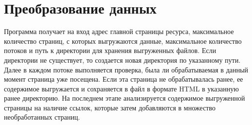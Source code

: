\chapter{Преобразование данных}

Программа получает на вход адрес главной страницы ресурса, максимальное количество страниц, с которых выгружаются данные, максимальное количество потоков и путь к директории для хранения выгруженных файлов. Если директории не существует, то создается новая директория по указанному пути. Далее в каждом потоке выполняется проверка, была ли обрабатываемая в данный момент страница уже посещена. Если эта страница не обрабатывалась ранее, ее содержимое выгружается и сохраняется в файл в формате HTML в указанную ранее директорию. На последнем этапе анализируется содержимое выгруженной страницы на наличие ссылок, которые затем добавляются в множество необработанных страниц.

